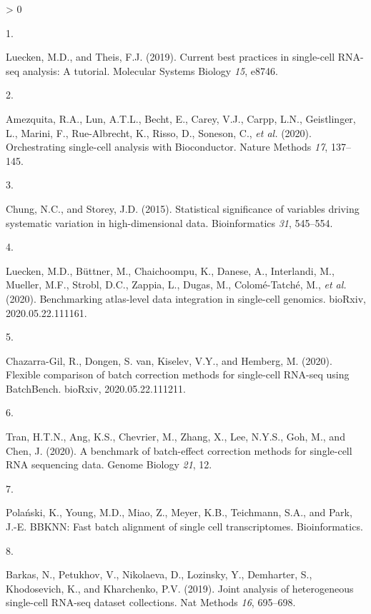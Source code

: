 \documentclass[
]{article}
\newlength{\cslhangindent}
\newlength{\csllabelwidth}
\newenvironment{CSLReferences}[2] %
 {%
  \setlength{\parindent}{0pt}
  \ifodd #1 \everypar{\setlength{\hangindent}{\cslhangindent}}\ignorespaces\fi
  \ifnum #2 > 0
  \setlength{\parskip}{#2\baselineskip}
  \fi
 }%
 {}
\newcommand{\CSLLeftMargin}[1]{\parbox[t]{\csllabelwidth}{#1}}
\newcommand{\CSLRightInline}[1]{\parbox[t]{\linewidth - \csllabelwidth}{#1}\break}
\begin{document}
\hypertarget{refs}{}
\begin{CSLReferences}{0}{0}
\leavevmode\hypertarget{ref-lueckenCurrentBestPractices2019}{}%
\CSLLeftMargin{1. }
\CSLRightInline{Luecken, M.D., and Theis, F.J. (2019). Current best practices in single-cell {RNA}-seq analysis: A tutorial. Molecular Systems Biology \emph{15}, e8746.}

\leavevmode\hypertarget{ref-amezquitaOrchestratingSinglecellAnalysis2020}{}%
\CSLLeftMargin{2. }
\CSLRightInline{Amezquita, R.A., Lun, A.T.L., Becht, E., Carey, V.J., Carpp, L.N., Geistlinger, L., Marini, F., Rue-Albrecht, K., Risso, D., Soneson, C., \emph{et al.} (2020). Orchestrating single-cell analysis with {Bioconductor}. Nature Methods \emph{17}, 137--145.}

\leavevmode\hypertarget{ref-chungStatisticalSignificanceVariables2015}{}%
\CSLLeftMargin{3. }
\CSLRightInline{Chung, N.C., and Storey, J.D. (2015). Statistical significance of variables driving systematic variation in high-dimensional data. Bioinformatics \emph{31}, 545--554.}

\leavevmode\hypertarget{ref-lueckenBenchmarkingAtlaslevelData2020}{}%
\CSLLeftMargin{4. }
\CSLRightInline{Luecken, M.D., Büttner, M., Chaichoompu, K., Danese, A., Interlandi, M., Mueller, M.F., Strobl, D.C., Zappia, L., Dugas, M., Colomé-Tatché, M., \emph{et al.} (2020). Benchmarking atlas-level data integration in single-cell genomics. bioRxiv, 2020.05.22.111161.}

\leavevmode\hypertarget{ref-chazarra-gilFlexibleComparisonBatch2020}{}%
\CSLLeftMargin{5. }
\CSLRightInline{Chazarra-Gil, R., Dongen, S. van, Kiselev, V.Y., and Hemberg, M. (2020). Flexible comparison of batch correction methods for single-cell {RNA}-seq using {BatchBench}. bioRxiv, 2020.05.22.111211.}

\leavevmode\hypertarget{ref-tranBenchmarkBatcheffectCorrection2020}{}%
\CSLLeftMargin{6. }
\CSLRightInline{Tran, H.T.N., Ang, K.S., Chevrier, M., Zhang, X., Lee, N.Y.S., Goh, M., and Chen, J. (2020). A benchmark of batch-effect correction methods for single-cell {RNA} sequencing data. Genome Biology \emph{21}, 12.}

\leavevmode\hypertarget{ref-polanskiBBKNNFastBatch}{}%
\CSLLeftMargin{7. }
\CSLRightInline{Polański, K., Young, M.D., Miao, Z., Meyer, K.B., Teichmann, S.A., and Park, J.-E. {BBKNN}: Fast batch alignment of single cell transcriptomes. Bioinformatics.}

\leavevmode\hypertarget{ref-barkasJointAnalysisHeterogeneous2019}{}%
\CSLLeftMargin{8. }
\CSLRightInline{Barkas, N., Petukhov, V., Nikolaeva, D., Lozinsky, Y., Demharter, S., Khodosevich, K., and Kharchenko, P.V. (2019). Joint analysis of heterogeneous single-cell {RNA}-seq dataset collections. Nat Methods \emph{16}, 695--698.}


\end{CSLReferences}
\end{document}
